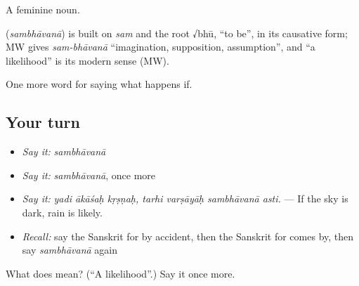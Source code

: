 A feminine noun.

\begin{cousinweb}
\textbf{} (\emph{sambhāvanā}) is built on \emph{sam} and the root √bhū, \textquotedblleft{}to be\textquotedblright{}, in its causative form; MW gives \emph{sam-bhāvanā} \textquotedblleft{}imagination, supposition, assumption\textquotedblright{}, and \textquotedblleft{}a likelihood\textquotedblright{} is its modern sense (MW).
\end{cousinweb}

\begin{grammarlens}[title={What you've built}]
One more word for saying what happens if.
\end{grammarlens}

\subsection*{Your turn}
\begin{itemize}
\raggedright
  \item \emph{Say it:} \emph{sambhāvanā}
  \item \emph{Say it:} \emph{sambhāvanā}, once more
  \item \emph{Say it:} \emph{yadi ākāśaḥ kṛṣṇaḥ, tarhi varṣāyāḥ sambhāvanā asti.} — If the sky is dark, rain is likely.
  \item \emph{Recall:} say the Sanskrit for by accident, then the Sanskrit for comes by, then say \emph{sambhāvanā} again
\end{itemize}

\begin{tcolorbox}[breakable,colback=teal!4,colframe=teal!35!black,title={Before you move on}]
What does  mean? (\textquotedblleft{}A likelihood\textquotedblright{}.) Say it once more.
\end{tcolorbox}
